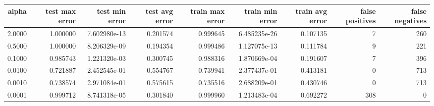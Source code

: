
\begin{table}[ht]
\tiny
\begin{tabular}{rrrrrrrrr}
\toprule
 alpha &  test max error &  test min error &  test avg error &  train max error &  train min error &  train avg error &  false positives &  false negatives \\
\midrule
2.0000 &        1.000000 &    7.602980e-13 &        0.201574 &         0.999645 &     6.485235e-26 &         0.107135 &                7 &              260 \\
0.5000 &        1.000000 &    8.206329e-09 &        0.194354 &         0.999486 &     1.127075e-13 &         0.111784 &                9 &              221 \\
0.1000 &        0.985743 &    1.221320e-03 &        0.300745 &         0.988316 &     1.870669e-04 &         0.191607 &                7 &              396 \\
0.0100 &        0.721887 &    2.452545e-01 &        0.554767 &         0.739941 &     2.377437e-01 &         0.413181 &                0 &              713 \\
0.0010 &        0.738574 &    2.971084e-01 &        0.575615 &         0.735516 &     2.688209e-01 &         0.430746 &                0 &              713 \\
0.0001 &        0.999712 &    8.741318e-05 &        0.301840 &         0.999960 &     1.213483e-04 &         0.692272 &              308 &                0 \\
\bottomrule
\end{tabular}
\end{table}